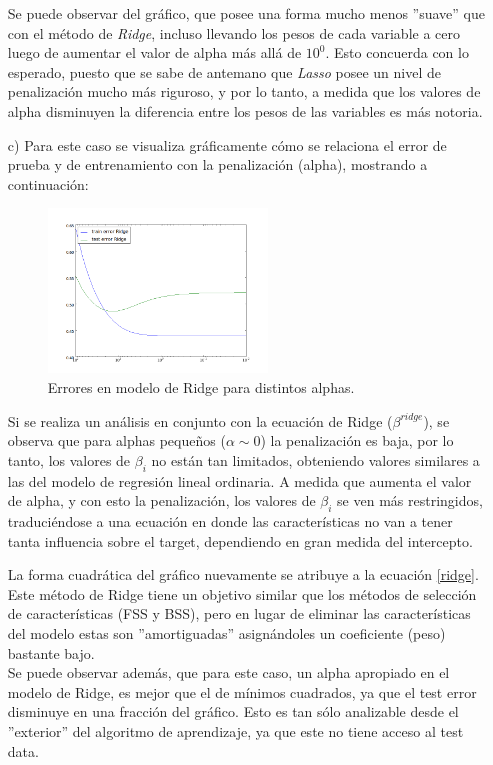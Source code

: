 \documentclass[10pt]{article}
\begin{document}
\begin{itemize}
Se puede observar del gráfico, que posee una forma mucho menos ''suave'' que con el método de \textit{Ridge}, incluso llevando los pesos de cada variable a cero luego de aumentar el valor de alpha más allá de $10^0$. Esto concuerda con lo esperado, puesto que se sabe de antemano que \textit{Lasso} posee un nivel de penalización mucho más riguroso, y por lo tanto, a medida que los valores de alpha disminuyen la diferencia entre los pesos de las variables es más notoria.\\

\item[c)] Para este caso se visualiza gráficamente cómo se relaciona el error de prueba y de entrenamiento con la penalización (alpha), mostrando a continuación:\\

\begin{figure}[!htb]
   \centering
   \includegraphics[width=0.55\textwidth]{images/alphas_ridge}
   \caption{Errores en modelo de Ridge para distintos alphas.}
   \label{err:ridge}
\end{figure}

\newpage

Si se realiza un análisis en conjunto con la ecuación de Ridge ($\beta^{ridge}$), se observa que para alphas pequeños ($\alpha \sim 0$) la penalización es baja, por lo tanto, los valores de $\beta_i$ no están tan limitados, obteniendo valores similares a las del modelo de regresión lineal ordinaria. A medida que aumenta el valor de alpha, y con esto la penalización, los valores de $\beta_i$ se ven más restringidos, traduciéndose a una ecuación en donde las características no van a tener tanta influencia sobre el target, dependiendo en gran medida del intercepto.

La forma cuadrática del gráfico nuevamente se atribuye a la ecuación \eqref{ridge}. Este método de Ridge tiene un objetivo similar que los métodos de selección de características (FSS y BSS), pero en lugar de eliminar las características del modelo estas son ''amortiguadas'' asignándoles un coeficiente (peso) bastante bajo.\\
Se puede observar además, que para este caso, un alpha apropiado en el modelo de Ridge, es mejor que el de mínimos cuadrados, ya que el test error disminuye en una fracción del gráfico. Esto es tan sólo analizable desde el ''exterior'' del algoritmo de aprendizaje, ya que este no tiene acceso al test data.



\end{itemize}
\end{document}
